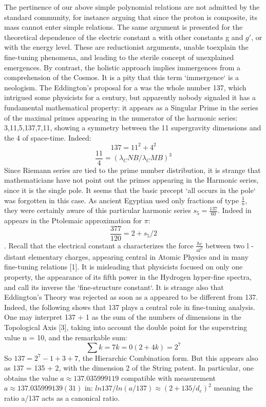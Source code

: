 The pertinence of our above simple polynomial relations are not admitted by the standard
community, for instance arguing that since the proton is composite, its mass cannot enter simple
relations. The same argument is presented for the theoretical dependence of the electric constant a
with other constants g and $g\prime$, or with the energy level. These are reductionist arguments, unable toexplain the fine-tuning phenomena, and leading to the sterile concept of unexplained emergences.
By contrast, the holistic approach implies immergences from a comprehension of the Cosmos. It is a
pity that this term `immergence` is a neologism.
The Eddington's proposal for a was the whole number 137, which intrigued some physicists for a
century, but apparently nobody signaled it has a fundamental mathematical property: it appears as a
Singular Prime in the series of the maximal primes appearing in the numerator of the harmonic
series: 3,11,5,137,7,11, showing a symmetry between the 11 supergravity dimensions and the 4 of
space-time. Indeed:
$$137 = 11^{2} + 4^{2}$$
$$\frac{11}{4} = (\lambda_CNB /\lambda_CMB )^{3}$$
Since Riemann series are tied to the prime number distribution, it is strange that mathematicians
have not point out the primes appearing in the Harmonic series, since it is the single pole. It seems
that the basic precept `all occurs in the pole` was forgotten in this case. As ancient Egyptian used
only fractions of type $\frac{1}{n}$, they were certainly aware of this particular harmonic series $s_{5} = \frac{137}{60}$.
Indeed in appears in the Ptolemaic approximation for $\pi$: $$\frac{377}{120} = 2 + s_{5}/2$$.
Recall that the electrical constant a characterizes the force $\frac{\hbar c}{al^{2}}$ between two l - distant
elementary charges, appearing central in Atomic Physics and in many fine-tuning relations [1]. It is
misleading that physicists focused on only one property, the appearance of its fifth power in the
Hydrogen hyper-fine spectra, and call its inverse the `fine-structure constant`. It is strange also that
Eddington's Theory was rejected as soon as a appeared to be different from 137. Indeed, the
following shows that 137 plays a central role in fine-tuning analysis. One may interpret 137 + 1 as
the sum of the numbers of dimensions in the Topological Axis [3], taking into account the double
point for the superstring value n = 10, and the remarkable sum:
$$\sum{k=7}{k=0}(2 + 4 k ) = 2^{7}$$
So $137 = 2^{7} - 1 + 3 + 7$, the Hierarchic Combination form. But this appears also as 137 = 135 + 2,
with the dimension 2 of the String patent. In particular, one obtains the value $a \approx 137.035999119$
compatible with measurement $a \approx 137.035999139(31)$ in:
$ln137/ln(a/137) \approx (2+135/d_{e})^{2}$
meaning the ratio a/137 acts as a canonical ratio.

